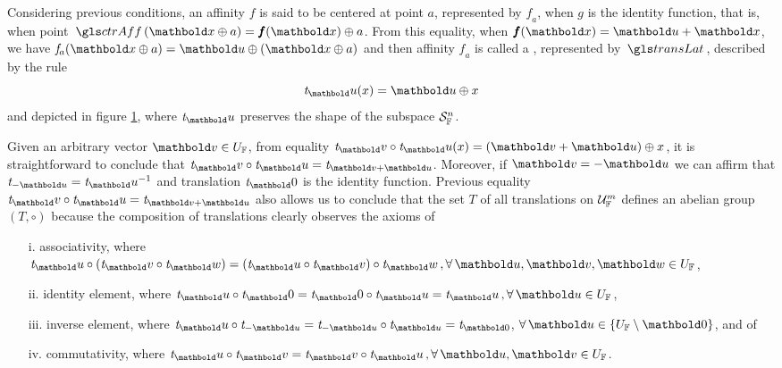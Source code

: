 Considering previous conditions, an affinity $\mathit{f}$ is said to be centered at point $a$, represented by $\mathit{f}_a$, when $\mathit{g}$ is the identity function, that is, when point $\fua{\gloref{ctrAff}}{\vto{x}\oplus a}=\fua{\vtf{f}}{\vto{x}}\oplus a$. From this equality, when $\fua{\vtf{f}}{\vto{x}}=\vto{u}+\vto{x}$, we have $\fua{\mathit{f}_a}{\vto{x}\oplus a}=\vto{u}\oplus(\vto{x}\oplus a)$ and then affinity $\mathit{f}_a$ is called a , represented by $\gloref{transLat}$, described by the rule
\begin{equation}\label{eq:translt}
\fua{\mathit{t}_\vto{u}}{x}=\vto{u}\oplus x
\end{equation}
and depicted in figure \ref{fg:translat}, where $\mathit{t}_\vto{u}$ preserves the shape of the subspace $\eamd{S}{F}{n}$.
\begin{figure}[!ht]
\centering
\begin{center}
\scalebox{.72}{}
\end{center}
\label{fg:translat}
\end{figure}
Given an arbitrary vector $\vto{v}\in U_\cam{F}$, from equality $\fua{\mathit{t}_\vto{v}\circ\mathit{t}_\vto{u}}{x}=(\vto{v}+\vto{u})\oplus x$,
it is straightforward to conclude that $\mathit{t}_\vto{v}\circ\mathit{t}_\vto{u}=\mathit{t}_{\vto{v}+\vto{u}}$. Moreover, if $\vto{v}=-\vto{u}$ we can affirm that $\mathit{t}_{-\vto{u}}=\mathit{t}_\vto{u}^{-1}$ and translation $\mathit{t}_\vto{0}$ is the identity function. Previous equality $\mathit{t}_\vto{v}\circ\mathit{t}_\vto{u}=\mathit{t}_{\vto{v}+\vto{u}}$ also allows us to conclude that the set $\mathit{T}$ of all translations on $\eamd{U}{F}{m}$ defines an abelian group $(\mathit{T},\circ)$ because the composition of translations clearly observes the axioms of
\begin{itemize}
\setlength\itemsep{.1em}
\item[i.] associativity, where $\mathit{t}_\vto{u}\circ\lpa \mathit{t}_\vto{v} \circ \mathit{t}_\vto{w} \rpa =
\lpa\mathit{t}_\vto{u}\circ \mathit{t}_\vto{v} \rpa\circ \mathit{t}_\vto{w} \, , \forall \, \vto{u},\vto{v},\vto{w}\in U_\cam{F}$,
\item[ii.] identity element, where $\mathit{t}_\vto{u}\circ\mathit{t}_\vto{0}=\mathit{t}_\vto{0}\circ\mathit{t}_\vto{u}=\mathit{t}_\vto{u}\,,\forall \, \vto{u} \in U_\cam{F}$,
\item[iii.] inverse element, where
$\mathit{t}_\vto{u} \circ  \mathit{t}_{-\vto{u}}= \mathit{t}_{-\vto{u}} \circ \mathit{t}_{\vto{u}} = \mathit{t}_{\vto{0}}$, $\forall \, \vto{u} \in \{U_\cam{F}\setminus\vto{0}\}$, and of
\item[iv.] commutativity, where $\mathit{t}_\vto{u}\circ \mathit{t}_\vto{v}= \mathit{t}_\vto{v}\circ \mathit{t}_\vto{u}\,,\forall \, \vto{u},\vto{v} \in U_\cam{F}$.
\end{itemize}
